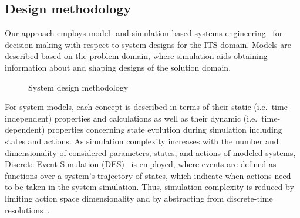 \documentclass[10pt,twocolumn]{article}
\begin{document}

\subsection{Design methodology}
\label{sec:methodology}

Our approach employs model- and simulation-based systems engineering~\cite{gianni2014modeling} for decision-making with respect to system designs for the ITS domain.
Models are described based on the problem domain, where simulation aids obtaining information about and shaping designs of the solution domain.

\begin{figure}[!ht]
	\centering
	\caption{System design methodology}
	\label{fig:concept}
\end{figure}

For system models, each concept is described in terms of their static (i.e.\ time-independent) properties and calculations as well as their dynamic (i.e.\ time-dependent) properties concerning state evolution during simulation including states and actions.
As simulation complexity increases with the number and dimensionality of considered parameters, states, and actions of modeled systems, Discrete-Event Simulation (DES)~\cite{fishman2001discrete} is employed, where events are defined as functions over a system's trajectory of states, which indicate when actions need to be taken in the system simulation.
Thus, simulation complexity is reduced by limiting action space dimensionality and by abstracting from discrete-time resolutions~\cite{ascher2023discrete}.

\end{document}
